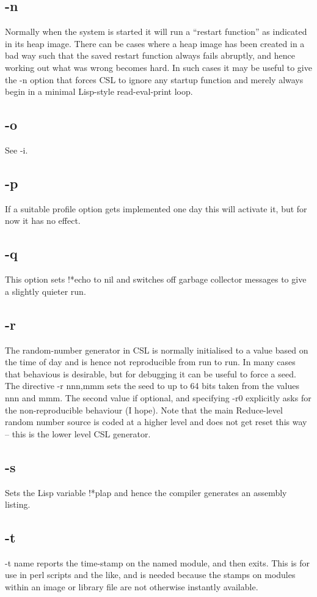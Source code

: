\documentclass[a4paper,11pt]{article}
\begin{document}
\subsection{\ttfamily -n}
Normally when the system is started it will run a ``restart function'' as
indicated in its heap image. There can be cases where a heap image has been
created in a bad way such that the saved restart function always fails
abruptly, and hence working out what was wrong becomes hard. In such cases
it may be useful to give the {\ttfamily -n} option that forces CSL to
ignore any startup function and merely always begin in a minimal Lisp-style
read-eval-print loop.
\subsection{\ttfamily -o}
See {\ttfamily -i}.
\subsection{\ttfamily -p}
If a suitable profile option gets implemented one day this will activate it,
but for now it has no effect.
\subsection{\ttfamily -q}
This option sets {\ttfamily !*echo} to {\ttfamily nil} and switches off
garbage collector messages to give a slightly quieter run.
\subsection{\ttfamily -r}
The random-number generator in CSL is normally initialised to a value
based on the time of day and is hence not reproducible from run to run.
In many cases that behavious is desirable, but for debugging it can be useful
to force a seed. The directive {\ttfamily -r nnn,mmm} sets the seed to
up to 64 bits taken from the values nnn and mmm. The second value if optional,
and specifying {\ttfamily -r0}  explicitly asks for the non-reproducible
behaviour (I hope). Note that the main Reduce-level random number source is
coded at a higher level and does not get reset this way -- this is the
lower level CSL generator.
\subsection{\ttfamily -s}
Sets the Lisp variable {\ttfamily !*plap} and hence the compiler generates
an assembly listing.
\subsection{\ttfamily -t}
{\ttfamily -t name} reports the time-stamp on the named module, and then
exits. This is for use in perl scripts and the like, and is
needed because the stamps on modules within an image or
library file are not otherwise instantly available.
\end{document}
